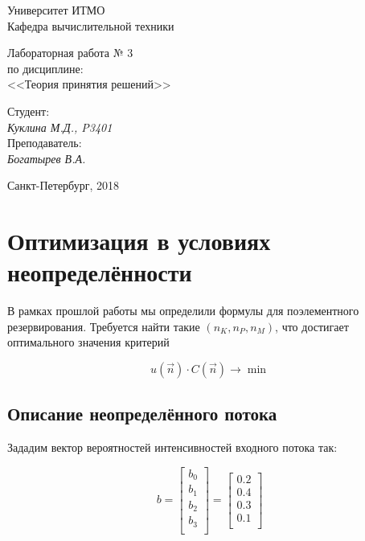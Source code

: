 \documentclass[12pt, a4paper] {ncc}
\begin{document}
\setcounter{figure}{0}
\frenchspacing
\pagestyle{empty}
\begin{center}
                            Университет ИТМО    \\
                        Кафедра вычислительной техники


\end{center}
\begin{center}
			Лабораторная работа № 3\\
		по дисциплине:\\
	<<Теория принятия решений>>
\end{center}
\begin{flushright}
                                    Студент:\\
                                    {\it Куклина М.Д., P3401}\\
                                    Преподаватель: \\
                                    {\it Богатырев В.А. }
\end{flushright}
\begin{center}
                             Санкт-Петербург, 2018
\end{center}
\newpage
\section{Оптимизация в условиях неопределённости}

В рамках прошлой работы мы определили формулы для поэлементного резервирования.
Требуется найти такие $(n_K, n_P, n_M)$, что достигает оптимального значения
критерий

$$u\left(\vec n\right) \cdot C\left(\vec n\right) \rightarrow \min$$

\subsection{Описание неопределённого потока}

Зададим вектор вероятностей интенсивностей входного потока так:

$$b =
\left[\begin{aligned}
b_0 \\
b_1 \\
b_2 \\
b_3 \\
\end{aligned}\right]
= 
\left[\begin{aligned}
0.2 \\
0.4 \\
0.3 \\
0.1 \\
\end{aligned}\right]$$
\end{document}
